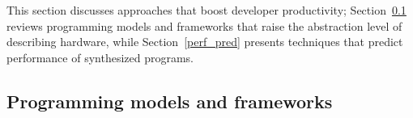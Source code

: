


This section discusses approaches that boost developer productivity; Section~\ref{prog_models_frameworks} reviews programming models and frameworks that raise the abstraction level of describing hardware, while Section~\ref{perf_pred} presents 
techniques that predict performance of synthesized programs.

\subsection{Programming models and frameworks}
\label{prog_models_frameworks}

